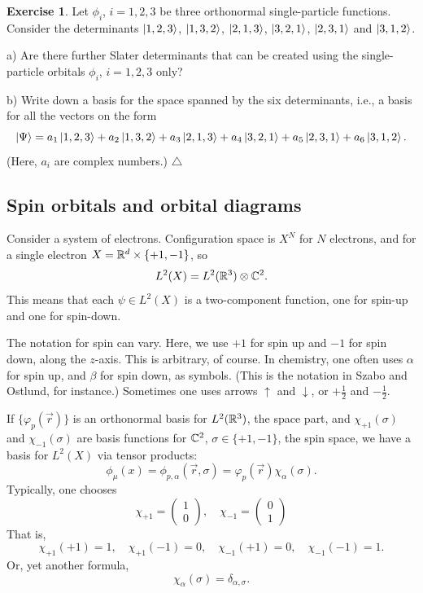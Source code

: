 \documentclass{report}
\theoremstyle{plain}
\theoremstyle{definition}
\newtheorem{exerc}{Exercise}[chapter]
\newcommand\xqed[1]{%
  \leavevmode\unskip\penalty9999 \hbox{}\nobreak\hfill
  \quad\hbox{#1}}
\newcommand\demo{\xqed{$\triangle$}}
\newenvironment{exercise}{\bigskip\begin{exerc}}{\demo\end{exerc}\bigskip}
\begin{document}
\begin{exercise}
  Let $\phi_i$, $i=1,2,3$ be three orthonormal single-particle
  functions. 
  Consider the determinants $\ket{1,2,3}$, $\ket{1,3,2}$,
  $\ket{2,1,3}$, $\ket{3,2,1}$, $\ket{2,3,1}$ and $\ket{3,1,2}$.

  a) Are there further Slater determinants that can be created using the
  single-particle orbitals $\phi_i$, $i=1,2,3$ only?

  b) Write down a basis for the space spanned by the six determinants,
  i.e., a basis for all the vectors on the form
  \[ \ket{\Psi} = a_1\ket{1,2,3} + a_2\ket{1,3,2} + a_3\ket{2,1,3} +
  a_4\ket{3,2,1} + a_5\ket{2,3,1} + a_6\ket{3,1,2}. \]
  (Here, $a_i$ are complex numbers.)
\end{exercise}



\subsection{Spin orbitals and orbital diagrams}


Consider a system of electrons. Configuration space is $X^N$ for $N$
electrons, and for a single electron $X = \mathbb{R}^d
\times \{ +1, -1 \}$, so
\[ L^2(X) = L^2(\mathbb{R}^3) \otimes \mathbb{C}^2. \]
This means that each $\psi \in L^2(X)$ is a two-component function, one for spin-up
and one for spin-down. 

The notation for spin can vary. Here, we use $+1$ for spin up and $-1$
for spin down, along the $z$-axis. This is arbitrary, of course. In
chemistry, one often uses $\alpha$ for spin up, and $\beta$ for spin
down, as symbols. (This is the notation in Szabo and Ostlund, for
instance.) Sometimes one uses arrows $\uparrow$ and
$\downarrow$, or $+\tfrac{1}{2}$ and $-\tfrac{1}{2}$.

If $\{\varphi_p(\vec{r})\}$ is an orthonormal
basis for $L^2(\mathbb{R}^3)$, the space part, and $\chi_{+1}(\sigma)$ and
$\chi_{-1}(\sigma)$ are basis functions for $\mathbb{C}^2$, $\sigma \in
\{+1,-1\}$, the spin space,
we have a basis for $L^2(X)$ via tensor products:
\[ \phi_\mu(x) = \phi_{p,\alpha}(\vec{r},\sigma) =
\varphi_p(\vec{r})\chi_{\alpha}(\sigma). \]
Typically, one chooses
\[ \chi_{+1} = \begin{pmatrix} 1 \\ 0 \end{pmatrix}, \quad \chi_{-1}
= \begin{pmatrix} 0 \\ 1 \end{pmatrix} \]
That is,
\[ \chi_{+1}(+1) = 1, \quad \chi_{+1}(-1) = 0, \quad \chi_{-1}(+1) =
0, \quad \chi_{-1}(-1) = 1. \]
Or, yet another formula,
\[ \chi_\alpha(\sigma) = \delta_{\alpha,\sigma}.\]
\end{document}
